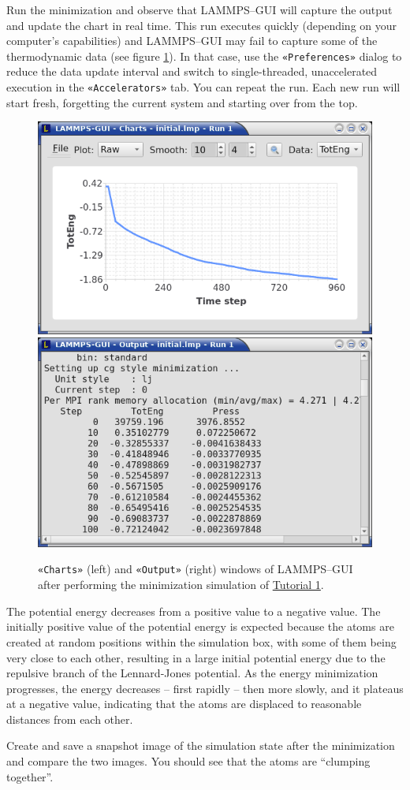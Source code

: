 \documentclass[9pt,tutorial]{livecoms}
\newcommand{\guicmd}[1]{\textcolor{command}{\texttt{«#1»}}} %
\begin{document}
Run the minimization and observe that LAMMPS--GUI will capture the output
and update the chart in real time.  This run executes quickly (depending
on your computer's capabilities) and LAMMPS--GUI may fail to capture some
of the thermodynamic data (see figure \ref{fig:chart-log}).  In that
case, use the \guicmd{Preferences} dialog to reduce the data update
interval and switch to single-threaded, unaccelerated execution in the
\guicmd{Accelerators} tab.  You can repeat the run.  Each new run will start
fresh, forgetting the current system and starting over from the top.

\begin{figure}
\centering
\includegraphics[width=0.49\linewidth]{chart-1}
\includegraphics[width=0.497\linewidth]{output-1}
\caption{\guicmd{Charts} (left) and \guicmd{Output} (right) windows of LAMMPS--GUI
  after performing the minimization simulation of \hyperref[lennard-jones-label]{Tutorial 1}.}
\label{fig:chart-log}
\end{figure}

The potential energy decreases from a positive value to a
negative value.  The initially positive value of the potential energy is
expected because the atoms are created at random positions within
the simulation box, with some of them being very close to each other,
resulting in a large initial potential energy due to the repulsive branch of the
Lennard-Jones potential.  As the energy minimization progresses, the
energy decreases -- first rapidly -- then more slowly, and it plateaus at
a negative value, indicating that the atoms are displaced to
reasonable distances from each other.

Create and save a snapshot image of the simulation state after the
minimization and compare the two images.  You should see that the atoms
are ``clumping together''.
\end{document}
